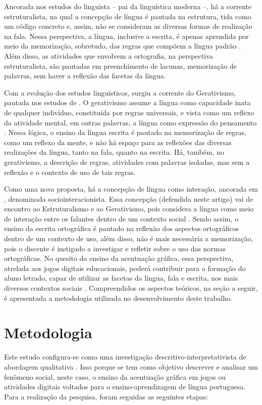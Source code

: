 \documentclass{textolivre}
\begin{document}
Ancorada nos estudos do linguista \textcite{saussure2006} – pai da linguística moderna –, há a corrente estruturalista, na qual a concepção de língua é pautada na estrutura, tida como um código concreto e, assim, não se consideram as diversas formas de realização na fala. Nessa perspectiva, a língua, inclusive a escrita, é apenas aprendida por meio da memorização, sobretudo, das regras que compõem a língua padrão \cite{costa_val1996, couto2020}. Além disso, as atividades que envolvem a ortografia, na perspectiva estruturalista, são pautadas em preenchimento de lacunas, memorização de palavras, sem haver a reflexão das facetas da língua.

Com a evolução dos estudos linguísticos, surgiu a corrente do Gerativismo, pautada nos estudos de \textcite{chomsky1986}. O gerativismo assume a língua como capacidade inata de qualquer indivíduo, constituída por regras universais, e vista como um reflexo da atividade mental, em outras palavras, a língua como expressão do pensamento \cite{costa_val1996, couto2020}. Nessa lógica, o ensino da língua escrita é pautado na memorização de regras, como um reflexo da mente, e não há espaço para as reflexões das diversas realizações da língua, tanto na fala, quanto na escrita. Há, também, no gerativismo, a descrição de regras, atividades com palavras isoladas, mas sem a reflexão e o contexto de uso de tais regras.

Como uma nova proposta, há a concepção de língua como interação, ancorada em \textcite{bakhtin2006}, denominada sociointeracionista. Essa concepção (defendida neste artigo) vai de encontro ao Estruturalismo e ao Gerativismo, pois considera a língua como meio de interação entre os falantes dentro de um contexto social \cite{couto2020}. Sendo assim, o ensino da escrita ortográfica é pautado na reflexão dos aspectos ortográficos dentro de um contexto de uso, além disso, não é mais necessária a memorização, pois o discente é instigado a investigar e refletir sobre o uso das normas ortográficas. No quesito do ensino da acentuação gráfica, essa perspectiva, atrelada aos jogos digitais educacionais, poderá contribuir para a formação do aluno letrado, capaz de utilizar as facetas da língua, fala e escrita, nos mais diversos contextos sociais \cite{soares2004}. Compreendidos os aspectos teóricos, na seção a seguir, é apresentada a metodologia utilizada no desenvolvimento deste trabalho.

\section{Metodologia}\label{sec-4}
Este estudo configura-se como uma investigação descritivo-interpretativista de abordagem qualitativa \cite{paiva2019}. Isso porque se tem como objetivo descrever e analisar um fenômeno social, neste caso, o ensino da acentuação gráfica em jogos ou atividades digitais voltados para o ensino-aprendizagem de língua portuguesa. Para a realização da pesquisa, foram seguidas as seguintes etapas:
\end{document}
